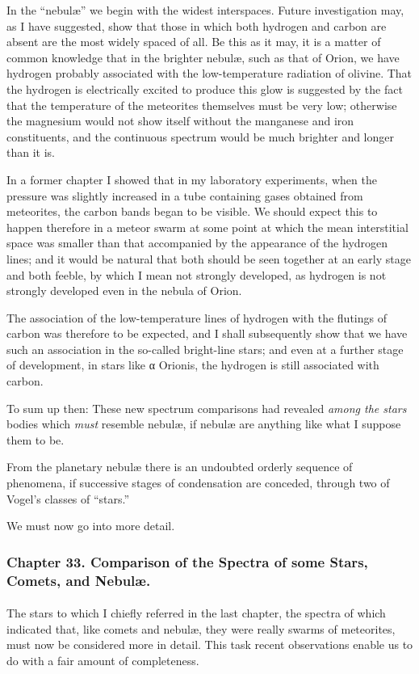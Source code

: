 \documentclass[a4paper, 12pt, oneside, polutonikogreek, english]{article}
\begin{document}
In the ``nebulæ'' we begin with the widest interspaces. Future investigation may, as I have suggested, show that those in which both hydrogen and carbon are absent are the most widely spaced of all. Be this as it may, it is a matter of common knowledge that in the brighter nebulæ, such as that of Orion, we have hydrogen probably associated with the low-temperature radiation of olivine. That the hydrogen is electrically excited to produce this glow is suggested by the fact that the temperature of the meteorites themselves must be very low; otherwise the magnesium would not show itself without the manganese and iron constituents, and the continuous spectrum would be much brighter and longer than it is.

In a former chapter I showed that in my laboratory experiments, when the pressure was slightly increased in a tube containing gases obtained from meteorites, the carbon bands began to be visible. We should expect this to happen therefore in a meteor swarm at some point at which the mean interstitial space was smaller than that accompanied by the appearance of the hydrogen lines; and it would be natural that both should be seen together at an early stage and both feeble, by which I mean not strongly developed, as hydrogen is not strongly developed even in the nebula of Orion.

The association of the low-temperature lines of hydrogen with the flutings of carbon was therefore to be expected, and I shall subsequently show that we have such an association in the so-called bright-line stars; and even at a further stage of development, in stars like α Orionis, the hydrogen is still associated with carbon.

To sum up then: These new spectrum comparisons had revealed \emph{among the stars} bodies which \emph{must} resemble nebulæ, if nebulæ are anything like what I suppose them to be.

From the planetary nebulæ there is an undoubted orderly sequence of phenomena, if successive stages of condensation are conceded, through two of Vogel's classes of ``stars.''

We must now go into more detail.
\clearpage
\subsubsection{Chapter 33. Comparison of the Spectra of some Stars, Comets, and Nebulæ.}
\paragraph{}
The stars to which I chiefly referred in the last chapter, the spectra of which indicated that, like comets and nebulæ, they were really swarms of meteorites, must now be considered more in detail. This task recent observations enable us to do with a fair amount of completeness.
\end{document}
